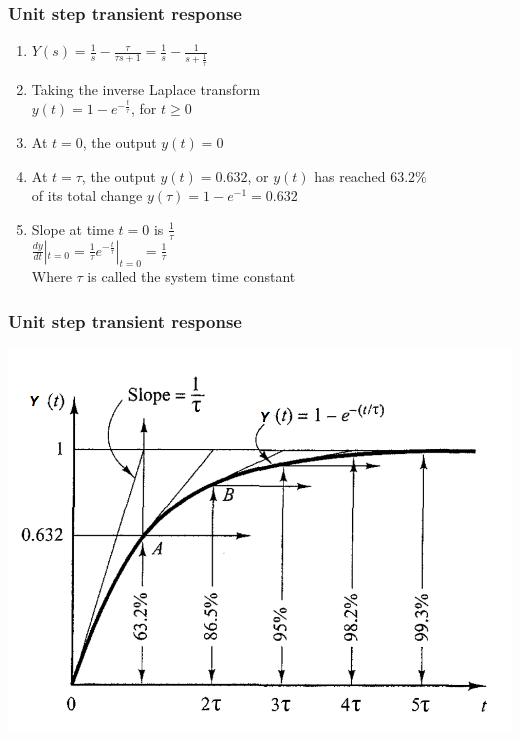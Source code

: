 \begin{frame}
\frametitle{Unit step transient response}
\begin{enumerate}
\item$Y(s)= \frac{1}{s} - \frac{\tau}{\tau s +1} = \frac{1}{s} - \frac{1}{s+\frac{1}{\tau}}$
\vspace{0.25cm}
\pause
\item Taking the inverse Laplace transform
\vspace{0.25cm}
\\ $y(t) = 1 - e^{-\frac{t}{\tau}}$, for $t\ge 0$ 
\vspace{0.25cm}
\pause
\item At $t=0$, the output $y(t)=0$
\vspace{0.25cm}
\pause
\item At $t=\tau$, the output $y(t)=0.632$, or $y(t)$ has reached $63.2\% $ 
\vspace{0.25cm} \\of its total change $y(\tau)= 1 - e^{-1} = 0.632$
\vspace{0.25cm}
\pause
\item Slope at time $t=0$ is $\frac{1}{\tau}$
\vspace{0.25cm}
\\ $\frac{dy}{dt}|_{t=0} = \frac{1}{\tau}e^{-\frac{t}{\tau}}|_{t=0} = \frac{1}{\tau}$
\vspace{0.25cm}
\\ Where $\tau$ is called the system time constant
\end{enumerate}
\end{frame}

\begin{frame}
\frametitle{Unit step transient response}
\includegraphics[width=1\linewidth]{Afbeelding2}
\end{frame}

